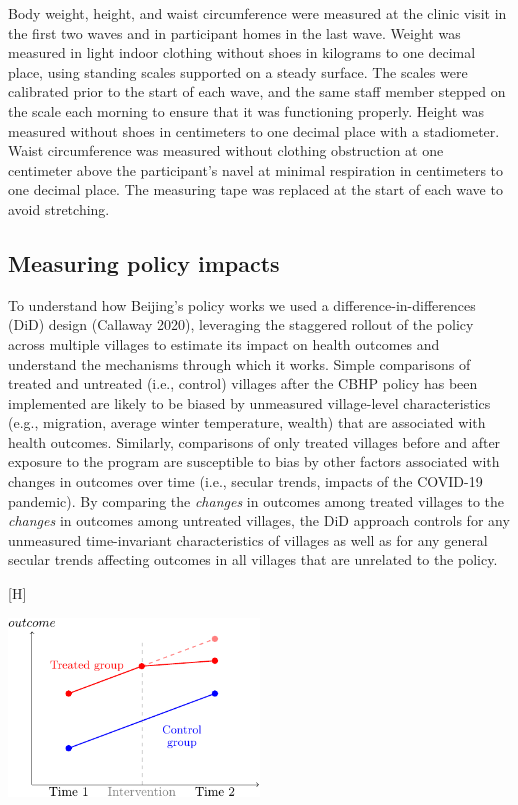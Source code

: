 \documentclass[
  letterpaper,
  DIV=11,
  numbers=noendperiod]{scrartcl}
\makeatletter
\renewenvironment{figure}%
   {\renewcommand\familydefault\sfdefault
    \@float{figure}}
   {\end@float}
\makeatother
\begin{document}
Body weight, height, and waist circumference were measured at the clinic
visit in the first two waves and in participant homes in the last wave.
Weight was measured in light indoor clothing without shoes in kilograms
to one decimal place, using standing scales supported on a steady
surface. The scales were calibrated prior to the start of each wave, and
the same staff member stepped on the scale each morning to ensure that
it was functioning properly. Height was measured without shoes in
centimeters to one decimal place with a stadiometer. Waist circumference
was measured without clothing obstruction at one centimeter above the
participant's navel at minimal respiration in centimeters to one decimal
place. The measuring tape was replaced at the start of each wave to
avoid stretching.

\hypertarget{measuring-policy-impacts}{%
\subsection{Measuring policy impacts}\label{measuring-policy-impacts}}

To understand how Beijing's policy works we used a
difference-in-differences (DiD) design (Callaway 2020), leveraging the
staggered rollout of the policy across multiple villages to estimate its
impact on health outcomes and understand the mechanisms through which it
works. Simple comparisons of treated and untreated (i.e., control)
villages after the CBHP policy has been implemented are likely to be
biased by unmeasured village-level characteristics (e.g., migration,
average winter temperature, wealth) that are associated with health
outcomes. Similarly, comparisons of only treated villages before and
after exposure to the program are susceptible to bias by other factors
associated with changes in outcomes over time (i.e., secular trends,
impacts of the COVID-19 pandemic). By comparing the \emph{changes} in
outcomes among treated villages to the \emph{changes} in outcomes among
untreated villages, the DiD approach controls for any unmeasured
time-invariant characteristics of villages as well as for any general
secular trends affecting outcomes in all villages that are unrelated to
the policy.

\begin{figure}[H]

{\centering \includegraphics[width=0.5\textwidth,height=\textheight]{hei-report_files/figure-pdf/fig-didfig-1.pdf}

}

\caption{\label{fig-didfig}Stylized example of
difference-in-differences}

\end{figure}
\end{document}
